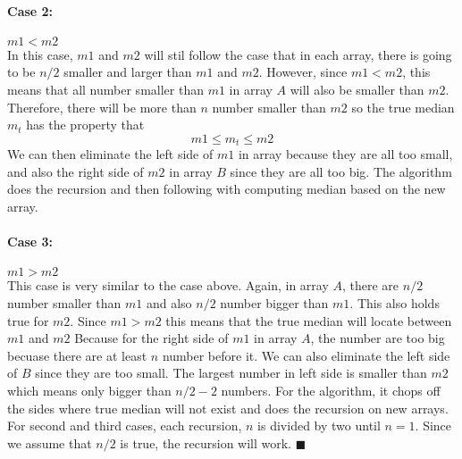 \documentclass{article}
\begin{document}
    \paragraph*{Case 2:} $m1 < m2$ \\
    In this case, $m1$ and $m2$ will stil follow the case that in each array, there is going to be $n/2$ smaller and larger than $m1$ and $m2$. However, since $m1 < m2$,
    this means that all number smaller than $m1$ in array $A$ will also be smaller than $m2$. Therefore, there will be more than $n$ number smaller than $m2$ so the true 
    median $m_t$ has the property that
    $$m1 \leq m_t \leq m2$$
    We can then eliminate the left side of $m1$ in array because they are all too small, and also the right side of $m2$ in array $B$ since they are all too big.
    The algorithm does the recursion and then following with computing median based on the new array.
    \paragraph*{Case 3:} $m1 > m2$ \\
    This case is very similar to the case above. Again, in array $A$, there are $n/2$ number smaller than $m1$ and also $n/2$ number bigger than $m1$. This also holds true
    for $m2$. Since $m1 > m2$ this means that the true median will locate between $m1$ and $m2$ Because for the right side of $m1$ in array $A$, the number are too big becuase
    there are at least $n$ number before it. We can also eliminate the left side of $B$ since they are too small. The largest number in left side is smaller than $m2$
    which means only bigger than $n/2 - 2$ numbers. For the algorithm, it chops off the sides where true median will not exist and does the recursion on new arrays.\\
    For second and third cases, each recursion, $n$ is divided by two until $n=1$. Since we assume that $n/2$ is true, the recursion will work. $\blacksquare$
\end{document}
